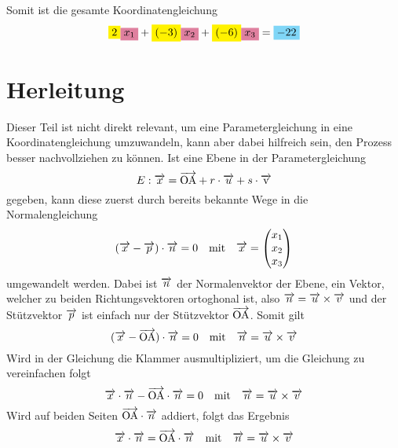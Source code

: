 \documentclass{article}
\begin{document}
Somit ist die gesamte Koordinatengleichung
\begin{equation} 
 \colorbox{yellow}{$2$} \colorbox{purple!50}{$x_1$} +
 \colorbox{yellow}{$(-3)$} \colorbox{purple!50}{$x_2$} +
 \colorbox{yellow}{$(-6)$} \colorbox{purple!50}{$x_3$}
 = \colorbox{cyan!50}{$-22$}
\end{equation} 
 
\setcounter{equation}{0}
\section*{Herleitung}
Dieser Teil ist nicht direkt relevant, um eine Parametergleichung in eine Koordinatengleichung umzuwandeln, kann aber dabei hilfreich sein, den Prozess besser nachvollziehen zu können. \newline
Ist eine Ebene in der Parametergleichung
\begin{equation}
 E: \overrightarrow{x} = \overrightarrow{\mathrm{OA}} + r \cdot \overrightarrow{u} + s \cdot \overrightarrow{\mathrm{v}} 
\end{equation}
gegeben, kann diese zuerst durch bereits bekannte Wege in die Normalengleichung
\begin{equation}
 (\overrightarrow{x} - \overrightarrow{p}) \cdot \overrightarrow{n} = 0
 \quad \text{mit} \quad
 \overrightarrow{x} = \begin{pmatrix} x_1 \\ x_2 \\ x_3 \end{pmatrix} 
\end{equation}
umgewandelt werden. Dabei ist $\overrightarrow{n}$ der Normalenvektor der Ebene, ein Vektor, welcher zu beiden Richtungsvektoren ortoghonal ist, also $\overrightarrow{n} = \overrightarrow{u} \times \overrightarrow{v}$ und der Stützvektor $\overrightarrow{p}$ ist einfach nur der Stützvektor $\overrightarrow{\mathrm{OA}}$.
Somit gilt 
\begin{equation}
 (\overrightarrow{x} - \overrightarrow{\mathrm{OA}}) \cdot \overrightarrow{n} = 0 
 \quad \text{mit} \quad
 \overrightarrow{n} = \overrightarrow{u} \times \overrightarrow{v}
\end{equation}
Wird in der Gleichung die Klammer ausmultipliziert, um die Gleichung zu vereinfachen folgt  
\begin{equation}
 \overrightarrow{x} \cdot \overrightarrow{n} - \overrightarrow{\mathrm{OA}} \cdot \overrightarrow{n} = 0 
 \quad \text{mit} \quad
 \overrightarrow{n} = \overrightarrow{u} \times \overrightarrow{v}
\end{equation}
Wird auf beiden Seiten $\overrightarrow{\mathrm{OA}} \cdot \overrightarrow{n}$ addiert, folgt das Ergebnis 
\begin{equation}
 \overrightarrow{x} \cdot \overrightarrow{n} = \overrightarrow{\mathrm{OA}} \cdot \overrightarrow{n} 
 \quad \text{mit} \quad
 \overrightarrow{n} = \overrightarrow{u} \times \overrightarrow{v}
\end{equation}
 
 
\end{document}
